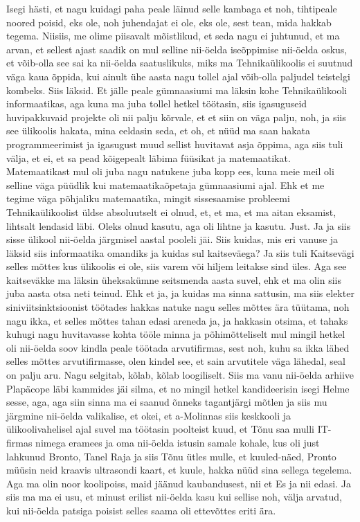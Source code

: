 Isegi hästi, et nagu kuidagi paha peale läinud selle kambaga et noh, tihtipeale noored poisid, eks ole, noh juhendajat ei ole, eks ole, sest tean, mida hakkab tegema.
Niisiis, me olime piisavalt mõistlikud, et seda nagu ei juhtunud, et ma arvan, et sellest ajast saadik on mul selline nii-öelda iseõppimise nii-öelda oskus, et võib-olla see sai ka nii-öelda saatuslikuks, miks ma Tehnikaülikoolis ei suutnud väga kaua õppida, kui ainult ühe aasta nagu tollel ajal võib-olla paljudel teistelgi kombeks.
Siis läksid.
Et jälle peale gümnaasiumi ma läksin kohe Tehnikaülikooli informaatikas, aga kuna ma juba tollel hetkel töötasin, siis igasuguseid huvipakkuvaid projekte oli nii palju kõrvale, et et siin on väga palju, noh, ja siis see ülikoolis hakata, mina eeldasin seda, et oh, et nüüd ma saan hakata programmeerimist ja igasugust muud sellist huvitavat asja õppima, aga siis tuli välja, et ei, et sa pead kõigepealt läbima füüsikat ja matemaatikat. Matemaatikast mul oli juba nagu natukene juba kopp ees, kuna meie meil oli selline väga püüdlik kui matemaatikaõpetaja gümnaasiumi ajal. Ehk et me tegime väga põhjaliku matemaatika, mingit sissesaamise probleemi Tehnikaülikoolist üldse absoluutselt ei olnud, et, et ma, et ma aitan eksamist, lihtsalt lendasid läbi.
Oleks olnud kasutu, aga oli lihtne ja kasutu. Just.
Ja ja siis sisse ülikool nii-öelda järgmisel aastal pooleli jäi.
Siis kuidas, mis eri vanuse ja läksid siis informaatika omandiks ja kuidas sul kaitseväega?
Ja siis tuli Kaitsevägi selles mõttes kus ülikoolis ei ole, siis varem või hiljem leitakse sind üles. Aga see kaitseväkke ma läksin üheksakümne seitsmenda aasta suvel, ehk et ma olin siis juba aasta otsa neti teinud. Ehk et ja, ja kuidas ma sinna sattusin, ma siis elekter siniviitsinktsioonist töötades hakkas natuke nagu selles mõttes ära tüütama, noh nagu ikka, et selles mõttes tahan edasi areneda ja, ja hakkasin otsima, et tahaks kuhugi nagu huvitavasse kohta tööle minna ja põhimõtteliselt mul mingil hetkel oli nii-öelda soov kindla peale töötada arvutifirmas, sest noh, kuhu sa ikka lähed selles mõttes arvutifirmasse, olen kindel see, et sain arvutitele väga lähedal, seal on palju aru.
Nagu selgitab, kõlab, kõlab loogiliselt.
Siis ma vanu nii-öelda arhiive Plapäcope läbi kammides jäi silma, et no mingil hetkel kandideerisin isegi Helme sesse, aga, aga siin sinna ma ei saanud õnneks tagantjärgi mõtlen ja siis mu järgmine nii-öelda valikalise, et okei, et a-Molinnas siis keskkooli ja ülikoolivahelisel ajal suvel ma töötasin poolteist kuud, et Tõnu saa mulli IT-firmas nimega eramees ja oma nii-öelda istusin samale kohale, kus oli just lahkunud Bronto, Tanel Raja ja siis Tõnu ütles mulle, et kuuled-näed, Pronto müüsin neid kraavis ultrasondi kaart, et kuule, hakka nüüd sina sellega tegelema. Aga ma olin noor koolipoiss, maid jäänud kaubandusest, nii et Es ja nii edasi. Ja siis ma ma ei usu, et minust erilist nii-öelda kasu kui sellise noh, välja arvatud, kui nii-öelda patsiga poisist selles saama oli ettevõttes eriti ära.
